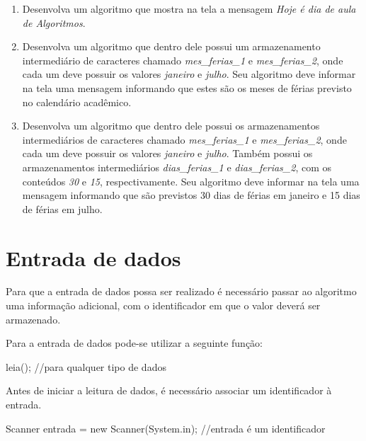 \documentclass[
  letterpaper,
  DIV=11,
  numbers=noendperiod]{scrreprt}
\newenvironment{Shaded}{\begin{snugshade}}{\end{snugshade}}
\newcommand{\AttributeTok}[1]{\textcolor[rgb]{0.40,0.45,0.13}{#1}}
\newcommand{\CommentTok}[1]{\textcolor[rgb]{0.37,0.37,0.37}{#1}}
\newcommand{\FunctionTok}[1]{\textcolor[rgb]{0.28,0.35,0.67}{#1}}
\newcommand{\KeywordTok}[1]{\textcolor[rgb]{0.00,0.23,0.31}{#1}}
\newcommand{\NormalTok}[1]{\textcolor[rgb]{0.00,0.23,0.31}{#1}}
\newcommand{\OperatorTok}[1]{\textcolor[rgb]{0.37,0.37,0.37}{#1}}
\providecommand{\tightlist}{%
  \setlength{\itemsep}{0pt}\setlength{\parskip}{0pt}}\usepackage{longtable,booktabs,array}
\begin{document}
\begin{enumerate}
\def\labelenumi{\arabic{enumi}.}
\tightlist
\item
  Desenvolva um algoritmo que mostra na tela a mensagem \emph{Hoje é dia
  de aula de Algoritmos}.
\item
  Desenvolva um algoritmo que dentro dele possui um armazenamento
  intermediário de caracteres chamado \emph{mes\_ferias\_1} e
  \emph{mes\_ferias\_2}, onde cada um deve possuir os valores
  \emph{janeiro} e \emph{julho}. Seu algoritmo deve informar na tela uma
  mensagem informando que estes são os meses de férias previsto no
  calendário acadêmico.
\item
  Desenvolva um algoritmo que dentro dele possui os armazenamentos
  intermediários de caracteres chamado \emph{mes\_ferias\_1} e
  \emph{mes\_ferias\_2}, onde cada um deve possuir os valores
  \emph{janeiro} e \emph{julho}. Também possui os armazenamentos
  intermediários \emph{dias\_ferias\_1} e \emph{dias\_ferias\_2}, com os
  conteúdos \emph{30} e \emph{15}, respectivamente. Seu algoritmo deve
  informar na tela uma mensagem informando que são previstos 30 dias de
  férias em janeiro e 15 dias de férias em julho.
\end{enumerate}

\section{Entrada de dados}\label{entrada-de-dados}

Para que a entrada de dados possa ser realizado é necessário passar ao
algoritmo uma informação adicional, com o identificador em que o valor
deverá ser armazenado.

Para a entrada de dados pode-se utilizar a seguinte função:

\begin{Shaded}
\begin{Highlighting}[]
\NormalTok{leia}\OperatorTok{();} \CommentTok{//para qualquer tipo de dados}
\end{Highlighting}
\end{Shaded}

Antes de iniciar a leitura de dados, é necessário associar um
identificador à entrada.

\begin{Shaded}
\begin{Highlighting}[]
\NormalTok{Scanner entrada }\OperatorTok{=} \KeywordTok{new} \FunctionTok{Scanner}\NormalTok{(System}\OperatorTok{.}\AttributeTok{in}\NormalTok{)}\OperatorTok{;} \CommentTok{//entrada é um identificador}
\end{Highlighting}
\end{Shaded}
\end{document}
